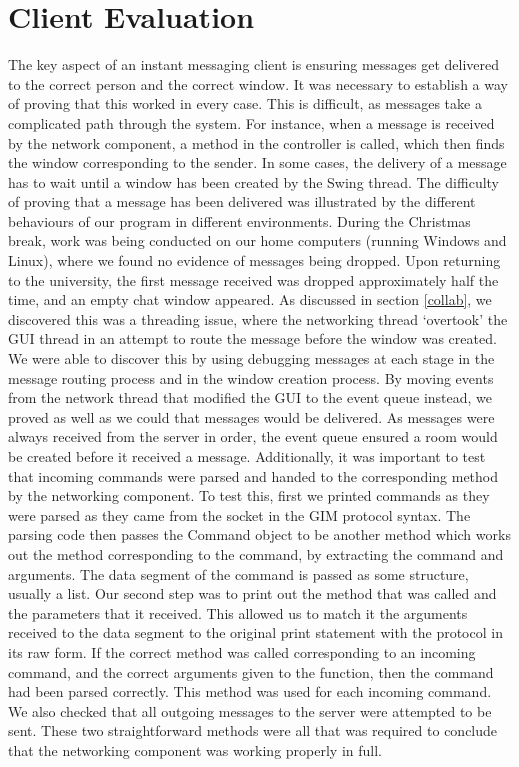 \section{Client Evaluation}
\label{client_eval}

The key aspect of an instant messaging client is ensuring messages get delivered to the correct person and the correct window. It was necessary to establish a way of proving that this worked in every case. This is difficult, as messages take a complicated path through the system. For instance, when a message is received by the network component, a method in the controller is called, which then finds the window corresponding to the sender. In some cases, the delivery of a message has to wait until a window has been created by the Swing thread. The difficulty of proving that a message has been delivered was illustrated by the different behaviours of our program in different environments. During the Christmas break, work was being conducted on our home computers (running Windows and Linux), where we found no evidence of messages being dropped. Upon returning to the university, the first message received was dropped approximately half the time, and an empty chat window appeared. As discussed in section \ref{collab}, we discovered this was a threading issue, where the networking thread `overtook' the GUI thread in an attempt to route the message before the window was created. We were able to discover this by using debugging messages at each stage in the message routing process and in the window creation process. By moving events from the network thread that modified the GUI to the event queue instead, we proved as well as we could that messages would be delivered. As messages were always received from the server in order, the event queue ensured a room would be created before it received a message. 
Additionally, it was important to test that incoming commands were parsed and handed to the corresponding method by the networking component. To test this, first we printed commands as they were parsed as they came from the socket in the GIM protocol syntax. The parsing code then passes the Command object to be another method which works out the method corresponding to the command, by extracting the command and arguments. The data segment of the command is passed as some structure, usually a list. Our second step was to print out the method that was called and the parameters that it received. This allowed us to match it the arguments received to the data segment to the original print statement with the protocol in its raw form. If the correct method was called corresponding to an incoming command, and the correct arguments given to the function, then the command had been parsed correctly. This method was used for each incoming command. We also checked that all outgoing messages to the server were attempted to be sent. These two straightforward methods were all that was required to conclude that the networking component was working properly in full.

